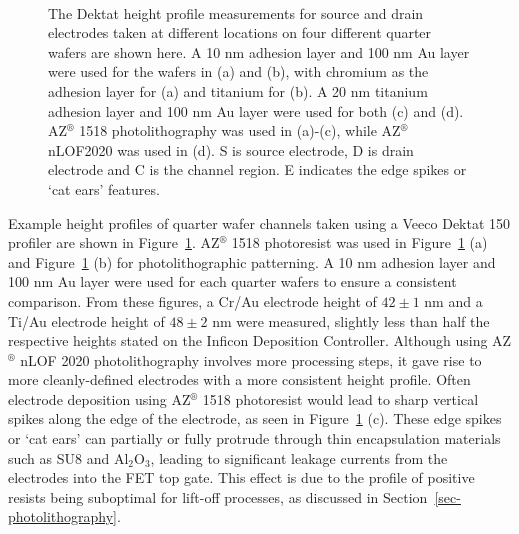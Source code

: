 \documentclass[
  a4paper,
]{scrbook}
\begin{document}
\begin{figure}
\begin{minipage}[t]{0.45\linewidth}
{{}

}

\end{minipage}%
%
\begin{minipage}[t]{0.01\linewidth}

{\centering 

~

}

\end{minipage}%

\caption{\label{fig-electrodes-dektat}The Dektat height profile
measurements for source and drain electrodes taken at different
locations on four different quarter wafers are shown here. A 10 nm
adhesion layer and 100 nm Au layer were used for the wafers in (a) and
(b), with chromium as the adhesion layer for (a) and titanium for (b). A
20 nm titanium adhesion layer and 100 nm Au layer were used for both (c)
and (d). AZ\(^\circledR\) 1518 photolithography was used in (a)-(c),
while AZ\(^\circledR\) nLOF2020 was used in (d). S is source electrode,
D is drain electrode and C is the channel region. E indicates the edge
spikes or `cat ears' features.}

\end{figure}

Example height profiles of quarter wafer channels taken using a Veeco
Dektat 150 profiler are shown in Figure~\ref{fig-electrodes-dektat}.
AZ\(^\circledR\) 1518 photoresist was used in
Figure~\ref{fig-electrodes-dektat} (a) and
Figure~\ref{fig-electrodes-dektat} (b) for photolithographic patterning.
A 10 nm adhesion layer and 100 nm Au layer were used for each quarter
wafers to ensure a consistent comparison. From these figures, a Cr/Au
electrode height of \(42\pm1\) nm and a Ti/Au electrode height of
\(48\pm2\) nm were measured, slightly less than half the respective
heights stated on the Inficon Deposition Controller. Although using
AZ\(^\circledR\) nLOF 2020 photolithography involves more processing
steps, it gave rise to more cleanly-defined electrodes with a more
consistent height profile. Often electrode deposition using
AZ\(^\circledR\) 1518 photoresist would lead to sharp vertical spikes
along the edge of the electrode, as seen in
Figure~\ref{fig-electrodes-dektat} (c). These edge spikes or `cat ears'
can partially or fully protrude through thin encapsulation materials
such as SU8 and Al\(_2\)O\(_3\), leading to significant leakage currents
from the electrodes into the FET top gate. This effect is due to the
profile of positive resists being suboptimal for lift-off processes, as
discussed in Section~\ref{sec-photolithography}.
\end{document}
